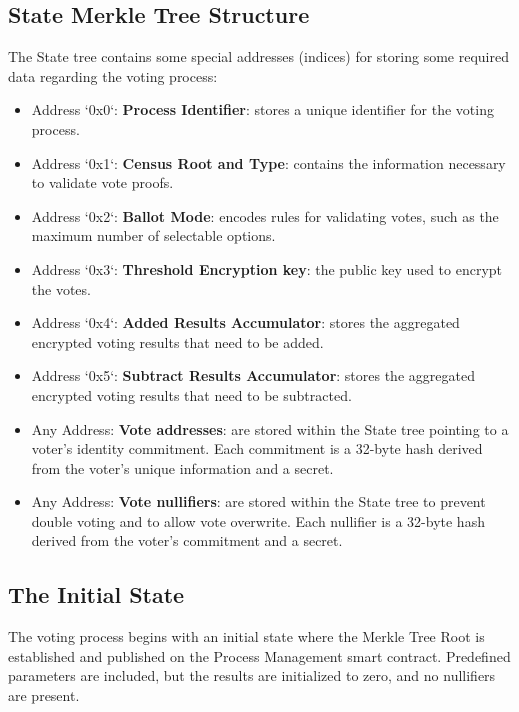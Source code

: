 \subsection{State Merkle Tree Structure}

The State tree contains some special addresses (indices) for storing some required data regarding the voting process:

\begin{itemize}
	\item Address `0x0`: \textbf{Process Identifier}: stores a unique identifier for the voting process.
	\item Address `0x1`: \textbf{Census Root and Type}: contains the information necessary to validate vote proofs.
	\item Address `0x2`: \textbf{Ballot Mode}: encodes rules for validating votes, such as the maximum number of selectable options.
	\item Address `0x3`: \textbf{Threshold Encryption key}: the public key used to encrypt the votes.
	\item Address `0x4`: \textbf{Added Results Accumulator}: stores the aggregated encrypted voting results that need to be added.
	\item Address `0x5`: \textbf{Subtract Results Accumulator}: stores the aggregated encrypted voting results that need to be subtracted.
	\item Any Address: \textbf{Vote addresses}: are stored within the State tree pointing to a voter's identity commitment. Each commitment is a 32-byte hash derived from the voter's unique information and a secret.
	\item Any Address: \textbf{Vote nullifiers}: are stored within the State tree to prevent double voting and to allow vote overwrite. Each nullifier is a 32-byte hash derived from the voter's commitment and a secret.
\end{itemize}

\begin{figure}[H]
	\centering
\end{figure}

\subsection{The Initial State}

The voting process begins with an initial state where the Merkle Tree Root is established and published on the Process Management smart contract. Predefined parameters are included, but the results are initialized to zero, and no nullifiers are present.

